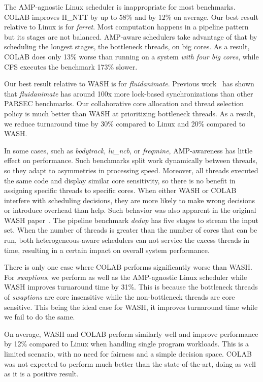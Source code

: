 The AMP-agnostic Linux scheduler is inappropriate for most benchmarks. COLAB improves H\_NTT by up to 58\% and by 12\% on average. Our best result relative to Linux is for \emph{ferret}. Most computation happens in a pipeline pattern but its stages are not balanced. AMP-aware schedulers take advantage of that by scheduling the longest stages, the bottleneck threads, on big cores. As a result, COLAB does only 13\% worse than running on a system \emph{with four big cores}, while CFS executes the benchmark 173\% slower.

Our best result relative to WASH is for \emph{fluidanimate}. Previous work~\cite{bienia08characterization} has shown that \emph{fluidanimate} has around 100x more lock-based synchronizations than other PARSEC benchmarks. Our collaborative core allocation and thread selection policy is much better than WASH at prioritizing bottleneck threads.  As a result, we reduce turnaround time by 30\% compared to Linux and 20\% compared to WASH.

In some cases, such as \emph{bodytrack}, \emph{lu\_ncb}, or \emph{freqmine}, AMP-awareness has little effect on performance. Such benchmarks split work dynamically between threads, so they adapt to asymmetries in processing speed. Moreover, all threads executed the same code and display similar core sensitivity, so there is no benefit in assigning specific threads to specific cores. When either WASH or COLAB interfere with scheduling decisions, they are more likely to make wrong decisions or introduce overhead than help. Such behavior was also apparent in the original WASH paper~\cite{jibaja2016portable}. The pipeline benchmark \emph{dedup} has five stages to stream the input set. When the number of threads is greater than the number of cores that can be run, both heterogeneous-aware schedulers can not service the excess threads in time, resulting in a certain impact on overall system performance.

There is only one case where COLAB performs significantly worse than WASH. For \emph{swaptions}, we perform as well as the AMP-agnostic Linux scheduler while WASH improves turnaround time by 31\%. This is because the bottleneck threads of \emph{swaptions} are core insensitive while the non-bottleneck threads are core sensitive. This being the ideal case for WASH, it improves turnaround time while we fail to do the same.

On average, WASH and COLAB perform similarly well and improve performance by 12\% compared to Linux when handling single program workloads. This is a limited scenario, with no need for fairness and a simple decision space. COLAB was not expected to perform much better than the state-of-the-art, doing as well as it is a positive result.


